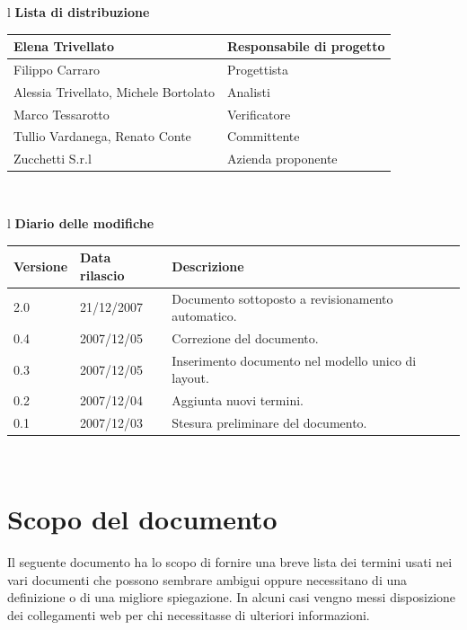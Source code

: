 \documentclass[11pt,titlepage,a4paper]{report}
\begin{document}
\begin{center}
\begin{table}[hbtp]
\large{
\begin{tabular}{l}
\Large{\textbf{\textsf{Lista di distribuzione}}} \\
\begin{tabular}{||p{6cm}||p{6cm}||} \hline
{Elena Trivellato}& Responsabile di progetto \\ \hline 
{Filippo Carraro}& Progettista \\ \hline
{Alessia Trivellato, Michele Bortolato}& Analisti \\ \hline
{Marco Tessarotto}& Verificatore \\ \hline
{Tullio Vardanega, Renato Conte}& Committente \\ \hline 
{Zucchetti S.r.l}& Azienda proponente\\ \hline
\end{tabular} \\
\end{tabular}
}
\end{table}
\begin{table}[hbtp]
\large{
\begin{tabular}{l}
\Large{\textbf{\textsf{Diario delle modifiche}}} \\
\begin{tabular}{||p{2cm}||p{3.5cm}||p{6cm}||} \hline
\textbf{Versione} & \textbf{Data rilascio} & \textbf{Descrizione} \\ \hline
2.0 & 21/12/2007 & Documento sottoposto a revisionamento automatico.\\ \hline
0.4 & 2007/12/05 & Correzione del documento. \\ \hline
0.3 & 2007/12/05 & Inserimento documento nel modello unico di layout. \\ \hline
0.2 & 2007/12/04 & Aggiunta nuovi termini. \\ \hline
0.1 & 2007/12/03 & Stesura preliminare del documento. \\ \hline

\end{tabular} \\
\end{tabular}

}
\end{table}
\end{center}
\newpage

\chapter{Scopo del documento}
Il seguente documento ha lo scopo di fornire una breve lista dei termini usati nei vari documenti che possono sembrare ambigui oppure necessitano di una definizione o di una migliore spiegazione. In alcuni casi vengno messi disposizione dei collegamenti web per chi necessitasse di ulteriori informazioni.
\end{document}
